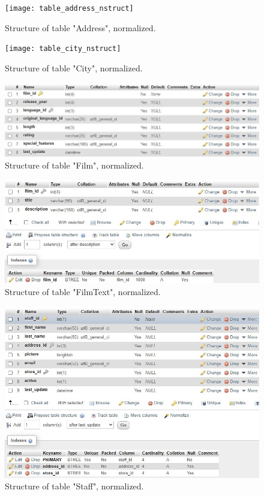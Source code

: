 \documentclass{article}
\begin{document}
		\begin{figure}[H]
			\texttt{[image: table\_address\_nstruct]}
			\caption{Structure of table "Address", normalized.}
		\end{figure}
		\begin{figure}[H]
			\texttt{[image: table\_city\_nstruct]}
			\caption{Structure of table "City", normalized.}
		\end{figure}
		\begin{figure}[H]
			\includegraphics[width=\textwidth]{table_film_nstruct}
			\caption{Structure of table "Film", normalized.}
		\end{figure}
		\begin{figure}[H]
			\includegraphics[width=\textwidth]{table_filmtext_nstruct}
			\caption{Structure of table "Film\textunderscore Text", normalized.}
		\end{figure}
		\begin{figure}[H]
			\includegraphics[width=\textwidth]{table_staff_nstruct}
			\caption{Structure of table "Staff", normalized.}
		\end{figure}
\end{document}
